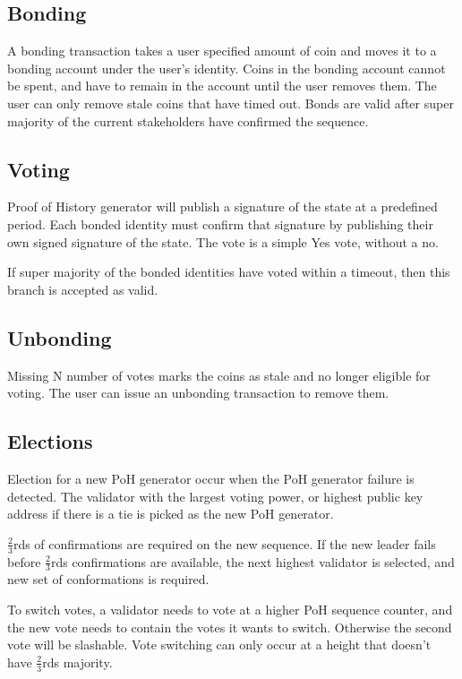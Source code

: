 \documentclass[12pt]{article}
\begin{document}
\subsection{Bonding}
A bonding transaction takes a user specified amount of coin and moves it to a bonding account under the user’s identity. Coins in the bonding account cannot be spent, and have to remain in the account until the user removes them. The user can only remove stale coins that have timed out. Bonds are valid after super majority of the current stakeholders have confirmed the sequence.

\subsection{Voting}
Proof of History generator will publish a signature of the state at a predefined period. Each bonded identity must confirm that signature by publishing their own signed signature of the state. The vote is a simple Yes vote, without a no.

If super majority of the bonded identities have voted within a timeout, then this branch is accepted as valid.

\subsection{Unbonding}

Missing N number of votes marks the coins as stale and no longer eligible for voting. The user can issue an unbonding transaction to remove them.
\subsection{Elections}\label{subsec:elections}
Election for a new PoH generator occur when the PoH generator failure is detected. The validator with the largest voting power, or highest public key address if there is a tie is picked as the new PoH generator.

\(\frac{2}{3}\)rds of confirmations are required on the new sequence. If the new leader fails before \(\frac{2}{3}\)rds confirmations are available, the next highest validator is selected, and new set of conformations is required.

To switch votes, a validator needs to vote at a higher PoH sequence counter, and the new vote needs to contain the votes it wants to switch. Otherwise the second vote will be slashable. Vote switching can only occur at a height that doesn’t have \(\frac{2}{3}\)rds majority.
\end{document}
